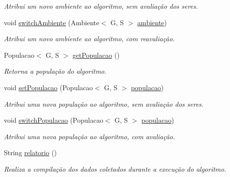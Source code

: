\begin{DoxyCompactItemize}
\begin{DoxyCompactList}\small\item\em Atribui um novo ambiente ao algoritmo, sem avaliação dos seres. \end{DoxyCompactList}\item 
void \hyperlink{classic_1_1populacional_1_1algoritmo_1_1_algoritmo_evolucionario_3_01_g_01extends_01_number_00_0bd52af860edf752f8985460efb0aa102_a098cf863f06ef59413951835e760be08}{switch\-Ambiente} (Ambiente$<$ G, S $>$ \hyperlink{classic_1_1populacional_1_1algoritmo_1_1_algoritmo_evolucionario_3_01_g_01extends_01_number_00_0bd52af860edf752f8985460efb0aa102_ad149586d38a1ad23204c414710203988}{ambiente})
\begin{DoxyCompactList}\small\item\em Atribui um novo ambiente ao algoritmo, com reavaliação. \end{DoxyCompactList}\item 
Populacao$<$ G, S $>$ \hyperlink{classic_1_1populacional_1_1algoritmo_1_1_algoritmo_evolucionario_3_01_g_01extends_01_number_00_0bd52af860edf752f8985460efb0aa102_a22063f2c93d0adbaae7e9d01f6c33940}{get\-Populacao} ()
\begin{DoxyCompactList}\small\item\em Retorna a população do algoritmo. \end{DoxyCompactList}\item 
void \hyperlink{classic_1_1populacional_1_1algoritmo_1_1_algoritmo_evolucionario_3_01_g_01extends_01_number_00_0bd52af860edf752f8985460efb0aa102_af0c96a46679b2488c0facb48e50c1b08}{set\-Populacao} (Populacao$<$ G, S $>$ \hyperlink{classic_1_1populacional_1_1algoritmo_1_1_algoritmo_evolucionario_3_01_g_01extends_01_number_00_0bd52af860edf752f8985460efb0aa102_ae8aa62f99168ff5609d3c0a74a0b71de}{populacao})
\begin{DoxyCompactList}\small\item\em Atribui uma nova população ao algoritmo, sem avaliação dos seres. \end{DoxyCompactList}\item 
void \hyperlink{classic_1_1populacional_1_1algoritmo_1_1_algoritmo_evolucionario_3_01_g_01extends_01_number_00_0bd52af860edf752f8985460efb0aa102_a35dc9060174558c574cce68a6990ac54}{switch\-Populacao} (Populacao$<$ G, S $>$ \hyperlink{classic_1_1populacional_1_1algoritmo_1_1_algoritmo_evolucionario_3_01_g_01extends_01_number_00_0bd52af860edf752f8985460efb0aa102_ae8aa62f99168ff5609d3c0a74a0b71de}{populacao})
\begin{DoxyCompactList}\small\item\em Atribui uma nova população ao algoritmo, com avaliação. \end{DoxyCompactList}\item 
String \hyperlink{classic_1_1populacional_1_1algoritmo_1_1_algoritmo_evolucionario_3_01_g_01extends_01_number_00_0bd52af860edf752f8985460efb0aa102_a6da158df043097b7ddec93c5a33017ed}{relatorio} ()
\begin{DoxyCompactList}\small\item\em Realiza a compilação dos dados coletados durante a execução do algoritmo. \end{DoxyCompactList}\end{DoxyCompactItemize}
